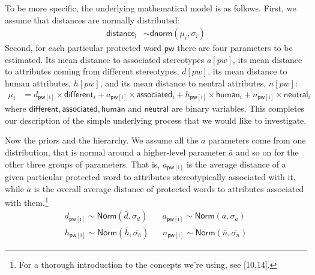 \documentclass[
  12pt,
  dvipsnames,enabledeprecatedfontcommands]{scrartcl}
\begin{document}
To be more specific, the underlying mathematical model is as follows.
First, we assume that distances are normally distributed:
\begin{align*} \mathsf{distance_i} & \sim \mathsf{dnorm}(\mu_i,\sigma_i)
\end{align*} \noindent Second, for each particular protected word
\(\mathsf{pw}\) there are four parameters to be estimated. Its mean
distance to associated stereotypes \(a[pw]\), its mean distance to
attributes coming from different stereotypes, \(d[pw]\), its mean
distance to human attributes, \(h[pw]\), and its mean distance to
neutral attributes, \(n[pw]\): \begin{align*}
\mu_i & = d_{\mathsf{pw[i]}} \times \mathsf{different}_i  + a_{\mathsf{pw[i]}} \times \mathsf{associated}_i  + h_{\mathsf{pw[i]}} \times \mathsf{human}_i  + n_{\mathsf{pw[i]}}\times \mathsf{neutral}_i
\end{align*} \noindent where
\(\mathsf{different}, \mathsf{associated},\mathsf{human}\) and
\(\mathsf{neutral}\) are binary variables. This completes our
description of the simple underlying process that we would like to
investigate.

Now the priors and the hierarchy. We assume all the \(a\) parameters
come from one distribution, that is normal around a higher-level
parameter \(\bar{a}\) and so on for the other three groups of
parameters. That is, \(a_{\mathsf{pw[i]}}\) is the average distance of a
given particular protected word to attributes stereotypically associated
with it, while \(\bar{a}\) is the overall average distance of protected
words to attributes associated with them.\footnote{For a thorough
  introduction to the concepts we're using, see {[}10,14{]}.}
\begin{align*}
d_{\mathsf{pw[i]}} \sim \mathsf{Norm}(\bar{d}, \overline{\sigma_d}) &  & 
a_{\mathsf{pw[i]}} \sim \mathsf{Norm}(\bar{a}, \overline{\sigma_a}) \\
h_{\mathsf{pw[i]}} \sim \mathsf{Norm}(\bar{h}, \overline{\sigma_h}) & & 
n_{\mathsf{pw[i]}} \sim \mathsf{Norm}(\bar{n}, \overline{\sigma_n}) 
\end{align*}
\end{document}
